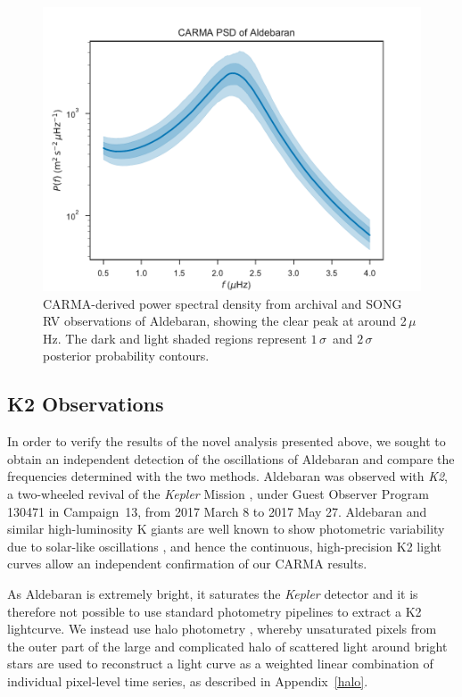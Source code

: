 \documentclass[modern]{aastex61}
\newcommand{\muHz}{\mbox{$\mu$Hz}\xspace}
\newcommand{\kepler}{\emph{Kepler}\xspace}
\newcommand{\ktwo}{\emph{K2}\xspace}
\begin{document}
\begin{figure}
\centering
\includegraphics[width=\textwidth]{psd-zoom.pdf}
\caption{CARMA-derived power spectral density from archival and SONG RV observations of Aldebaran, showing the clear peak at around 2\,\muHz. The dark and light shaded regions represent $1\,\sigma$~and $2\,\sigma$ posterior probability contours. }
\label{psd}
\end{figure}


\subsection{K2 Observations}

In order to verify the results of the novel analysis presented above, we sought to obtain an independent detection of the oscillations of Aldebaran and compare the frequencies determined with the two methods.
Aldebaran was observed with \ktwo \citep{howell14}, a two-wheeled revival of the \kepler Mission \citep{2010sci...327..977b}, under Guest Observer Program 130471 in Campaign~13, from 2017 March 8 to 2017 May 27. Aldebaran and similar high-luminosity K giants are well known to show photometric variability due to solar-like oscillations \citep{bedding2000}, and hence the continuous, high-precision K2 light curves allow an independent confirmation of our CARMA results.

As Aldebaran is extremely bright, it saturates the \kepler detector and it is therefore not possible to use standard photometry pipelines to extract a K2 lightcurve. We instead use halo photometry \citep{White2017}, whereby unsaturated pixels from the outer part of the large and complicated halo of scattered light around bright stars are used to reconstruct a light curve as a weighted linear combination of individual pixel-level time series, as described in Appendix~\ref{halo}.
\end{document}
